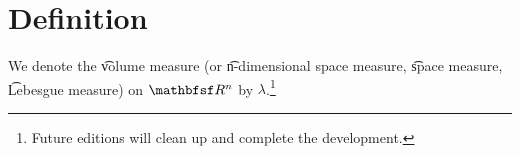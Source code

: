 
\section*{Definition}

We denote the \t{volume measure} (or \t{n-dimensional space measure}, \t{space measure}, \t{Lebesgue measure}) on $\R ^n$ by $\lambda $.\footnote{Future editions will clean up and complete the development.}

\blankpage